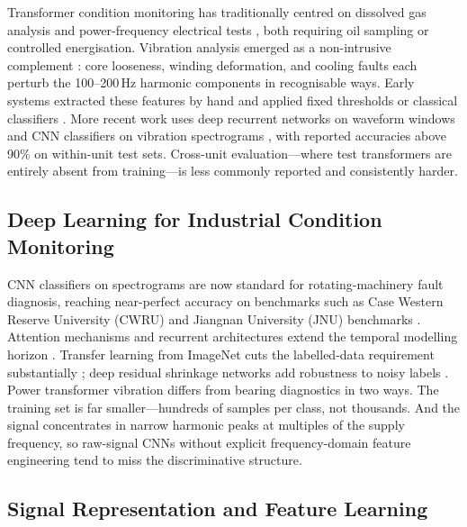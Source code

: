 \documentclass[preprint,12pt,3p]{elsarticle}
\let\cite\citep   %
\begin{document}
Transformer condition monitoring has traditionally centred on dissolved
gas analysis and power-frequency electrical tests
\cite{ieee2019c57,cigre2015TB642},
both requiring oil sampling or controlled energisation.
Vibration analysis emerged as a non-intrusive complement
\cite{bagheri2018transformer}: core looseness, winding
deformation, and cooling faults each perturb the 100--200\,Hz harmonic
components in recognisable ways.
Early systems extracted these features by hand and applied fixed
thresholds or classical classifiers
\cite{tenbohlen2016diagnostic,zollanvari2021transformer}.
More recent work uses deep recurrent networks on waveform windows and
CNN classifiers on vibration spectrograms
\cite{hong2021transformer,li2023cnn}, with
reported accuracies above 90\% on within-unit test sets.
Cross-unit evaluation---where test transformers are entirely absent
from training---is less commonly reported and consistently harder.

\subsection{Deep Learning for Industrial Condition Monitoring}

CNN classifiers on spectrograms are now standard for rotating-machinery
fault diagnosis, reaching near-perfect accuracy on benchmarks such as
Case Western Reserve University (CWRU) and Jiangnan University (JNU)
benchmarks \cite{guo2019transfer,wen2018cnn}.
Attention mechanisms and recurrent architectures extend the temporal
modelling horizon \cite{zhao2019deep,zhao2017bilstm}.
Transfer learning from ImageNet cuts the labelled-data requirement
substantially \cite{shao2019transfer}; deep residual
shrinkage networks add robustness to noisy labels
\cite{zhao2020shrinkage}.
Power transformer vibration differs from bearing diagnostics in two ways.
The training set is far smaller---hundreds of samples per class, not
thousands.
And the signal concentrates in narrow harmonic peaks at multiples of
the supply frequency, so raw-signal CNNs without explicit frequency-domain
feature engineering tend to miss the discriminative structure.

\subsection{Signal Representation and Feature Learning}
\end{document}
